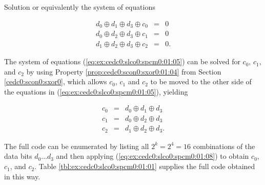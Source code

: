 \begin{vworkexampleparsection}{Solution}
\noindent{}or equivalently the system of equations

\begin{eqnarray}
\nonumber
d_0 \oplus d_1 \oplus d_3 \oplus c_0 & = & 0 \\ 
\label{eq:ex:cedc0:slco0:spcm0:01:05}
d_0 \oplus d_2 \oplus d_3 \oplus c_1 & = & 0 \\ 
\nonumber
d_1 \oplus d_2 \oplus d_3 \oplus c_2 & = & 0 .
\end{eqnarray}

\noindent{}The system of equations (\ref{eq:ex:cedc0:slco0:spcm0:01:05})
can be solved for $c_0$, $c_1$, and $c_2$ by using 
Property \ref{prop:cedc0:scon0:sxor0:01:04}
from Section \ref{cedc0:scon0:sxor0}, which allows $c_0$, $c_1$ and $c_2$ to
be moved to the other side of the equations in (\ref{eq:ex:cedc0:slco0:spcm0:01:05}),
yielding

\begin{eqnarray}
\nonumber
c_0 & = & d_0 \oplus d_1 \oplus d_3          \\ 
\label{eq:ex:cedc0:slco0:spcm0:01:08}
c_1 & = & d_0 \oplus d_2 \oplus d_3          \\ 
\nonumber
c_2  & = & d_1 \oplus d_2 \oplus d_3 .
\end{eqnarray}

The full code can be enumerated by listing all $2^k = 2^4 = 16$ combinations of
the data bits $d_0\ldots{}d_3$ and then applying (\ref{eq:ex:cedc0:slco0:spcm0:01:08})
to obtain $c_0$, $c_1$, and $c_2$.  Table \ref{tbl:ex:cedc0:slco0:spcm0:01:01}
supplies the full code obtained in this way.


\end{vworkexampleparsection}
